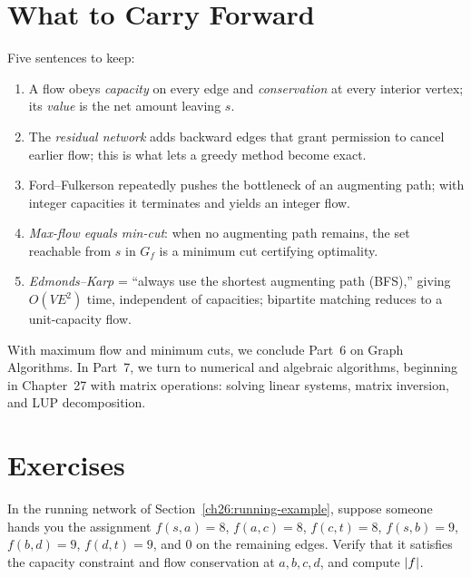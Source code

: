 \section{What to Carry Forward}
\label{ch26:recap}

\begin{recoverybox}
Five sentences to keep:
\begin{enumerate}
  \item A flow obeys \emph{capacity} on every edge and \emph{conservation} at
        every interior vertex; its \emph{value} is the net amount leaving $s$.
  \item The \emph{residual network} adds backward edges that grant permission
        to cancel earlier flow; this is what lets a greedy method become exact.
  \item Ford--Fulkerson repeatedly pushes the bottleneck of an augmenting path;
        with integer capacities it terminates and yields an integer flow.
  \item \emph{Max-flow equals min-cut}: when no augmenting path remains, the
        set reachable from $s$ in $G_f$ is a minimum cut certifying optimality.
  \item \emph{Edmonds--Karp} = ``always use the shortest augmenting path
        (BFS),'' giving $O(VE^2)$ time, independent of capacities; bipartite
        matching reduces to a unit-capacity flow.
\end{enumerate}
\end{recoverybox}

With maximum flow and minimum cuts, we conclude Part~6 on Graph Algorithms. In Part~7, we turn to numerical and algebraic algorithms, beginning in Chapter~27 with matrix operations: solving linear systems, matrix inversion, and LUP decomposition.

\section*{Exercises}

\begin{exercise}
\label{ch26:ex-read}
In the running network of Section~\ref{ch26:running-example}, suppose someone
hands you the assignment $f(s,a)=8$, $f(a,c)=8$, $f(c,t)=8$, $f(s,b)=9$,
$f(b,d)=9$, $f(d,t)=9$, and $0$ on the remaining edges. Verify that it satisfies
the capacity constraint and flow conservation at $a,b,c,d$, and compute
$\lvert f\rvert$.
\end{exercise}

